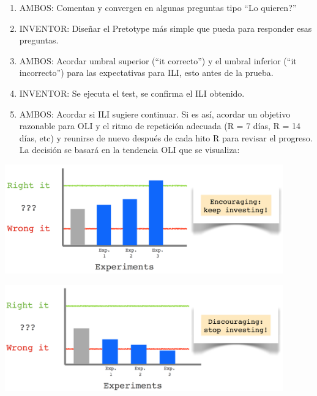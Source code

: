 \documentclass{article}
\begin{document}
\begin{enumerate}

\item AMBOS: Comentan y convergen en algunas preguntas tipo ``Lo quieren?''

\item INVENTOR: Dise\~nar el Pretotype m\'as simple que pueda para responder esas preguntas.

\item AMBOS: Acordar umbral superior (``it correcto'') y el umbral inferior (``it incorrecto'') para las expectativas para ILI, esto antes de la prueba.

\item INVENTOR: Se ejecuta el test, se confirma el ILI obtenido.

\item AMBOS: Acordar si ILI sugiere continuar. Si es as\'i, acordar un objetivo razonable para OLI y el ritmo de repetici\'on adecuada (R = 7 d\'ias, R = 14 d\'ias, etc) y reunirse de nuevo despu\'es de cada hito R para revisar el progreso. La decisi\'on se basar\'a en la tendencia OLI que se visualiza:

\end{enumerate}

\begin{center}
    \includegraphics[width=0.9\textwidth]{experimento_1}
\end{center}

\begin{center}
    \includegraphics[width=0.9\textwidth]{experimento_2}
\end{center}
\end{document}
